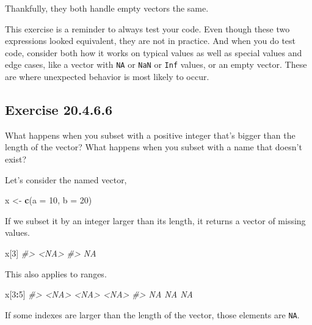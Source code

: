 \documentclass[]{book}
\newenvironment{Shaded}{\begin{snugshade}}{\end{snugshade}}
\newcommand{\CommentTok}[1]{\textcolor[rgb]{0.56,0.35,0.01}{\textit{#1}}}
\newcommand{\DataTypeTok}[1]{\textcolor[rgb]{0.13,0.29,0.53}{#1}}
\newcommand{\DecValTok}[1]{\textcolor[rgb]{0.00,0.00,0.81}{#1}}
\newcommand{\KeywordTok}[1]{\textcolor[rgb]{0.13,0.29,0.53}{\textbf{#1}}}
\newcommand{\NormalTok}[1]{#1}
\newcommand{\OperatorTok}[1]{\textcolor[rgb]{0.81,0.36,0.00}{\textbf{#1}}}
\newcommand{\StringTok}[1]{\textcolor[rgb]{0.31,0.60,0.02}{#1}}
\theoremstyle{plain}
\theoremstyle{remark}
\begin{document}
Thankfully, they both handle empty vectors the same.

This exercise is a reminder to always test your code. Even though these
two expressions looked equivalent, they are not in practice. And when
you do test code, consider both how it works on typical values as well
as special values and edge cases, like a vector with \texttt{NA} or
\texttt{NaN} or \texttt{Inf} values, or an empty vector. These are where
unexpected behavior is most likely to occur.

\hypertarget{exercise-20.4.6.6}{%
\subsection*{\texorpdfstring{Exercise
{20.4.6.6}}{Exercise 20.4.6.6}}\label{exercise-20.4.6.6}}

What happens when you subset with a positive integer that's bigger than
the length of the vector? What happens when you subset with a name that
doesn't exist?

Let's consider the named vector,

\begin{Shaded}
\begin{Highlighting}[]
\NormalTok{x <-}\StringTok{ }\KeywordTok{c}\NormalTok{(}\DataTypeTok{a =} \DecValTok{10}\NormalTok{, }\DataTypeTok{b =} \DecValTok{20}\NormalTok{)}
\end{Highlighting}
\end{Shaded}

If we subset it by an integer larger than its length, it returns a
vector of missing values.

\begin{Shaded}
\begin{Highlighting}[]
\NormalTok{x[}\DecValTok{3}\NormalTok{]}
\CommentTok{#> <NA> }
\CommentTok{#>   NA}
\end{Highlighting}
\end{Shaded}

This also applies to ranges.

\begin{Shaded}
\begin{Highlighting}[]
\NormalTok{x[}\DecValTok{3}\OperatorTok{:}\DecValTok{5}\NormalTok{]}
\CommentTok{#> <NA> <NA> <NA> }
\CommentTok{#>   NA   NA   NA}
\end{Highlighting}
\end{Shaded}

If some indexes are larger than the length of the vector, those elements
are \texttt{NA}.
\end{document}
